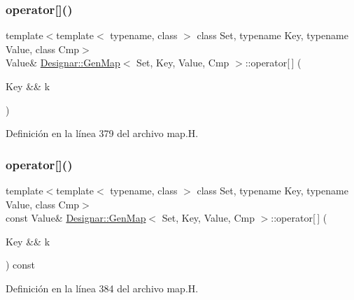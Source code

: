 \subsubsection{\texorpdfstring{operator[]()}{operator[]()}\hspace{0.1cm}{\footnotesize\ttfamily [3/4]}}
{\footnotesize\ttfamily template$<$template$<$ typename, class $>$ class Set, typename Key, typename Value, class Cmp$>$ \\
Value\& \hyperlink{class_designar_1_1_gen_map}{Designar\+::\+Gen\+Map}$<$ Set, Key, Value, Cmp $>$\+::operator\mbox{[}$\,$\mbox{]} (\begin{DoxyParamCaption}\item[{Key \&\&}]{k }\end{DoxyParamCaption})\hspace{0.3cm}{\ttfamily [inline]}}



Definición en la línea 379 del archivo map.\+H.

\mbox{\label{class_designar_1_1_gen_map_ac28a9a47f9d373466fe64c6a16105e74}} 
\subsubsection{\texorpdfstring{operator[]()}{operator[]()}\hspace{0.1cm}{\footnotesize\ttfamily [4/4]}}
{\footnotesize\ttfamily template$<$template$<$ typename, class $>$ class Set, typename Key, typename Value, class Cmp$>$ \\
const Value\& \hyperlink{class_designar_1_1_gen_map}{Designar\+::\+Gen\+Map}$<$ Set, Key, Value, Cmp $>$\+::operator\mbox{[}$\,$\mbox{]} (\begin{DoxyParamCaption}\item[{Key \&\&}]{k }\end{DoxyParamCaption}) const\hspace{0.3cm}{\ttfamily [inline]}}



Definición en la línea 384 del archivo map.\+H.

\mbox{\label{class_designar_1_1_gen_map_a9d4608ebd3b589a6989d838979a7b2e7}} 

